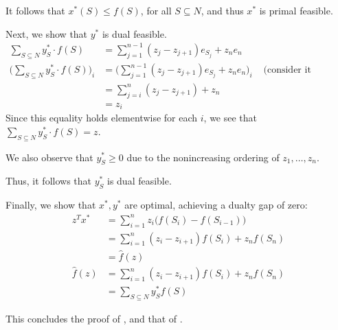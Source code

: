 It follows that $x^*(S) \leq f(S)$, for all $S \subseteq N$, and thus $x^*$ is primal feasible.

Next, we show that $y^*$ is dual feasible.
\begin{align*}
\sum_{S \subseteq N} y_S^* \cdot f(S)  
&= \sum_{j = 1}^{n-1} (z_j - z_{j+1}) e_{S_j} + z_n e_n \\
\bigg( \sum_{S \subseteq N} y_S^* \cdot f(S)  \bigg)_i
&= \bigg( \sum_{j = 1}^{n-1} (z_j - z_{j+1}) e_{S_j} + z_n e_n \bigg)_i & \text{ (consider it elementwise) } \\
&= \sum_{j = i}^{n} (z_j - z_{j+1}) + z_n \\
&= z_i
\end{align*}
Since this equality holds elementwise for each $i$, we see that  $\sum_{S \subseteq N} y_S^* \cdot f(S)  = z$.

We also observe that $y_S^* \geq 0$ due to the nonincreasing ordering of $z_1, \dots, z_n$.

Thus, it follows that $y_S^*$ is dual feasible.

Finally, we show that $x^*, y^*$  are optimal, achieving a dualty gap of zero:
\begin{align*}
z^T x^*
&= \sum_{i=1}^{n} z_i \big( f(S_i) - f(S_{i-1}) \big) \\
&= \sum_{i=1}^{n} (z_i - z_{i+1}) f(S_i) + z_n f(S_n) \\
&= \hat f(z) \\
\hat f(z) 
&= \sum_{i=1}^{n} (z_i - z_{i+1}) f(S_i) + z_n f(S_n) \\
&= \sum_{S \subseteq N} y_S^* f(S)
\end{align*}

This concludes the proof of , and that of .

%  